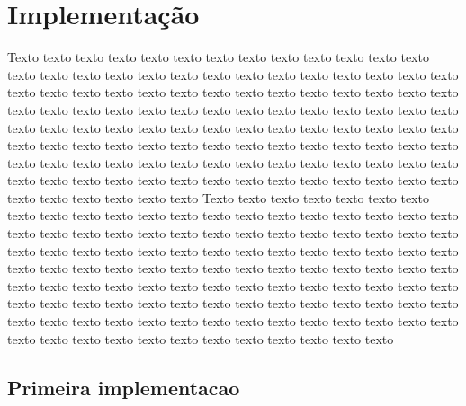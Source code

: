 \chapter{Implementação}
\label{cap:implementacao}

Texto texto texto texto texto texto texto texto texto texto texto texto texto
texto texto texto texto texto texto texto texto texto texto texto texto texto
texto texto texto texto texto texto texto texto texto texto texto texto texto
texto texto texto texto texto texto texto texto texto texto texto texto texto
texto texto texto texto texto texto texto texto texto texto texto texto texto 
texto texto texto texto texto texto texto texto texto texto texto texto texto 
texto texto texto texto texto texto texto texto texto texto texto texto texto 
texto texto texto texto texto texto texto texto texto texto texto texto texto 
texto texto texto texto texto texto texto texto texto texto texto texto texto
Texto texto texto texto texto texto texto texto texto texto texto texto texto
texto texto texto texto texto texto texto texto texto texto texto texto texto
texto texto texto texto texto texto texto texto texto texto texto texto texto
texto texto texto texto texto texto texto texto texto texto texto texto texto
texto texto texto texto texto texto texto texto texto texto texto texto texto 
texto texto texto texto texto texto texto texto texto texto texto texto texto 
texto texto texto texto texto texto texto texto texto texto texto texto texto 
texto texto texto texto texto texto texto texto texto texto texto texto texto 
texto texto texto texto texto texto texto texto texto texto texto texto texto

\section{Primeira implementacao}
\label{sec:implementacao_um}

